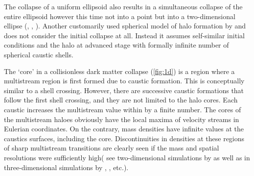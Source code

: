 The collapse of a uniform ellipsoid also results in a simultaneous collapse of the entire ellipsoid
however this time not into a point but into a two-dimensional ellipse (\citealt{Lin1965a}, \citealt{Icke1975}, \citealt{Eisenstein1995}).
Another customarily used spherical model of halo formation by \cite{Fillmore1984} and \cite{Bertschinger1985} does not consider
the initial collapse at all. Instead it assumes self-similar initial conditions and the halo at advanced stage with formally infinite number of spherical caustic shells.

The `core' in a collisionless dark matter collapse (\autoref{fig:1d}) is a region where a multistream region is first formed due to caustic formation. This is conceptually similar to a shell crossing. However, there are successive caustic formations that follow the first shell crossing, and they are not limited to the halo cores. Each caustic increases the multistream value within by a finite number. The cores of the multistream haloes obviously have the local maxima of velocity streams in Eulerian coordinates. On the contrary, mass densities have infinite values at the caustics surfaces, including the core. Discontinuities in densities at these regions of sharp multistream transitions are clearly seen if the mass and spatial resolutions were sufficiently high( see two-dimensional simulations by \citealt{Melott1989} as well as in three-dimensional simulations by \citealt{Hahn2013}, \citealt{Angulo2016}, \citealt{Hahn2016a} etc.). 

